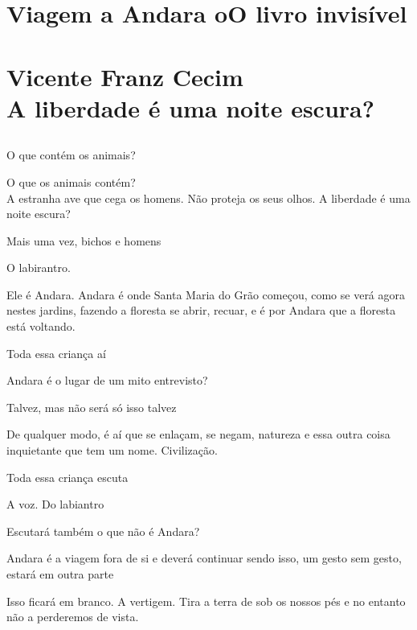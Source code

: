 \clearpage{\pagestyle{empty}\cleardoublepage}
\movetooddpage
\part*{Viagem a Andara oO livro invisível\\
\bigskip
\bigskip
\bigskip
\bigskip
{}\\
\Large{Vicente Franz Cecim}\\
\bigskip
\bigskip
\normalsize{A liberdade é uma noite escura?}}



\chapter*{}

\forceindent{}O que contém os animais?

O que os animais contém?\\

A estranha ave que cega os homens. Não proteja os seus olhos. A liberdade é uma noite escura?

Mais uma vez, bichos e homens

\pagebreak

O labirantro.

Ele é Andara. Andara é onde Santa Maria do Grão começou, como se verá
agora nestes jardins, fazendo a floresta se abrir, recuar, e é por
Andara que a floresta está voltando.

Toda essa criança aí

Andara é o lugar de um mito entrevisto?

Talvez, mas não será só isso talvez

De qualquer modo, é aí que se enlaçam, se negam, natureza e essa outra
coisa inquietante que tem um nome. Civilização.

Toda essa criança escuta

A voz. Do labiantro

\pagebreak

Escutará também o que não é Andara?

Andara é a viagem fora de si e deverá continuar sendo isso, um gesto sem
gesto, estará em outra parte

Isso ficará em branco. A vertigem. Tira a terra de sob os nossos pés e
no entanto não a perderemos de vista.

